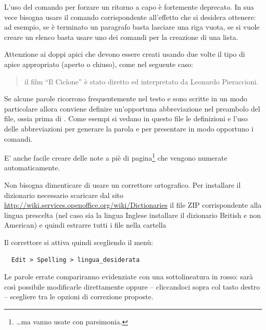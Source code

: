 L'uso del comando \cmd{\bs\bs} per forzare un ritorno a capo è fortemente deprecato. In sua vece bisogna usare il comando corrispondente all'effetto che si desidera ottenere: ad esempio, se è terminato un paragrafo basta lasciare una riga vuota, se si vuole creare un elenco basta usare uno dei comandi per la creazione di una lista.

Attenzione ai doppi apici  che devono essere creati usando due volte il tipo di apice appropriato (aperto o chiuso), come nel seguente caso:
\begin{quote}
il film ``Il Ciclone'' è stato diretto ed interpretato da Leonardo Pieraccioni.
\end{quote}
Se alcune parole ricorrono frequentemente nel testo e sono scritte in un modo particolare allora conviene definire un'opportuna abbreviazione nel preambolo del file, ossia prima di . Come esempi si vedano in questo file le definizioni e l'uso delle abbreviazioni  per generare la parola \ltx e  per presentare in modo opportuno i comandi.

E' anche facile creare delle note a piè di pagina\footnote{\ldots ma vanno usate con parsimonia.} che vengono numerate automaticamente.

Non bisogna dimenticare di usare un correttore ortografico. Per installare il dizionario necessario scaricare dal sito \url{http://wiki.services.openoffice.org/wiki/Dictionaries} il file ZIP corrispondente alla lingua prescelta (nel caso sia la lingua Inglese installare il dizionario British e non American) e quindi estrarre tutti i file nella  cartella
\begin{center}
\end{center}
Il correttore si attiva quindi scegliendo il menù:
\begin{verbatim}
  Edit > Spelling > lingua_desiderata
\end{verbatim}
Le parole errate compariranno evidenziate con una sottolineatura in rosso: sarà così possibile modificarle direttamente oppure -- cliccandoci sopra col tasto destro -- scegliere tra le opzioni di correzione proposte.

